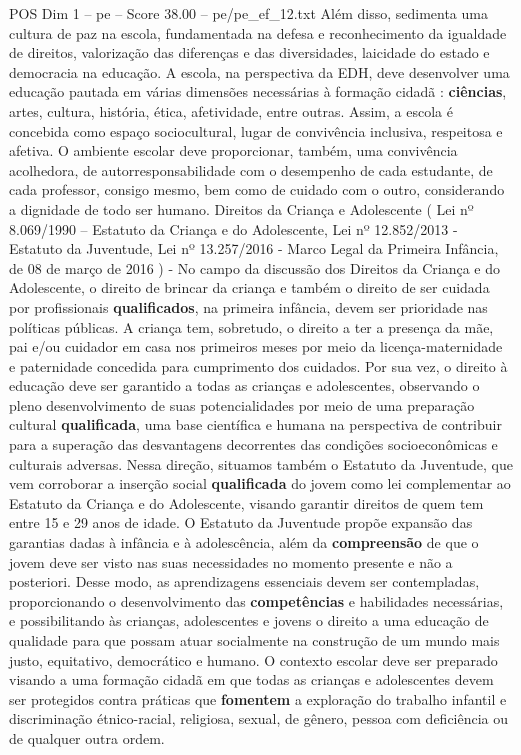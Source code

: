 \begin{textsample}{POS Dim 1 – pe – Score 38.00 – pe/pe\_ef\_12.txt}
Além disso, sedimenta uma cultura de paz na escola, fundamentada na defesa e reconhecimento da igualdade de direitos, valorização das diferenças e das diversidades, laicidade do estado e democracia na educação.
A escola, na perspectiva da EDH, deve desenvolver uma educação pautada em várias dimensões necessárias à formação cidadã : \textbf{ciências}, artes, cultura, história, ética, afetividade, entre outras.
Assim, a escola é concebida como espaço sociocultural, lugar de convivência inclusiva, respeitosa e afetiva.
O ambiente escolar deve proporcionar, também, uma convivência acolhedora, de autorresponsabilidade com o desempenho de cada estudante, de cada professor, consigo mesmo, bem como de cuidado com o outro, considerando a dignidade de todo ser humano.
Direitos da Criança e Adolescente ( Lei nº 8.069/1990 – Estatuto da Criança e do Adolescente, Lei nº 12.852/2013 - Estatuto da Juventude, Lei nº 13.257/2016 - Marco Legal da Primeira Infância, de 08 de março de 2016 ) - No campo da discussão dos Direitos da Criança e do Adolescente, o direito de brincar da criança e também o direito de ser cuidada por profissionais \textbf{qualificados}, na primeira infância, devem ser prioridade nas políticas públicas.
A criança tem, sobretudo, o direito a ter a presença da mãe, pai e/ou cuidador em casa nos primeiros meses por meio da licença-maternidade e paternidade concedida para cumprimento dos cuidados.
Por sua vez, o direito à educação deve ser garantido a todas as crianças e adolescentes, observando o pleno desenvolvimento de suas potencialidades por meio de uma preparação cultural \textbf{qualificada}, uma base científica e humana na perspectiva de contribuir para a superação das desvantagens decorrentes das condições socioeconômicas e culturais adversas.
Nessa direção, situamos também o Estatuto da Juventude, que vem corroborar a inserção social \textbf{qualificada} do jovem como lei complementar ao Estatuto da Criança e do Adolescente, visando garantir direitos de quem tem entre 15 e 29 anos de idade.
O Estatuto da Juventude propõe expansão das garantias dadas à infância e à adolescência, além da \textbf{compreensão} de que o jovem deve ser visto nas suas necessidades no momento presente e não a posteriori.
Desse modo, as aprendizagens essenciais devem ser contempladas, proporcionando o desenvolvimento das \textbf{competências} e habilidades necessárias, e possibilitando às crianças, adolescentes e jovens o direito a uma educação de qualidade para que possam atuar socialmente na construção de um mundo mais justo, equitativo, democrático e humano.
O contexto escolar deve ser preparado visando a uma formação cidadã em que todas as crianças e adolescentes devem ser protegidos contra práticas que \textbf{fomentem} a exploração do trabalho infantil e discriminação étnico-racial, religiosa, sexual, de gênero, pessoa com deficiência ou de qualquer outra ordem.

\end{textsample}
